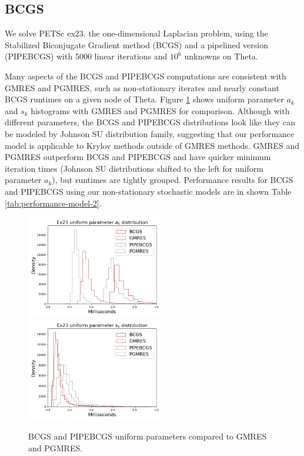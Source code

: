 \documentclass[sigconf]{acmart}
\begin{document}
\subsection{BCGS}\label{sec:bcgs}

We solve PETSc ex23, the one-dimensional Laplacian problem, using the Stabilized Biconjugate Gradient method (BCGS) and a pipelined version (PIPEBCGS) with 5000 linear iterations and $10^6$ unknowns on Theta.  

Many aspects of the BCGS and PIPEBCGS computations are consistent with GMRES and PGMRES, such as non-stationary iterates and nearly constant BCGS runtimes on a given node of Theta. 
Figure \ref{fig:bcgs} shows uniform parameter $a_k$ and $s_k$ histograms with GMRES and PGMRES for comparison. 
Although with different parameters, the BCGS and PIPEBCGS distributions look like they can be modeled by Johnson SU distribution family, 
suggesting that our performance model is applicable to Krylov methods outside of GMRES methods.
GMRES and PGMRES outperform BCGS and PIPEBCGS and have quicker minimum iteration times (Johnson SU distributions shifted to the left for uniform parameter $a_k$), but runtimes are  tightly grouped.
Performance results for BCGS and PIPEBCGS using our non-stationary stochastic models are in shown Table \ref{tab:performance-model-2}.


\begin{figure}[t]
\centering
\includegraphics[width=6cm]{../plots/BCGS_GMRES_PIPEBCGS_PGMRES_ex23_8192_1000000_uniform_a_k.png} 
\includegraphics[width=6cm]{../plots/BCGS_GMRES_PIPEBCGS_PGMRES_ex23_8192_1000000_uniform_s_k.png}
\caption{BCGS and PIPEBCGS uniform parameters compared to GMRES and PGMRES.} \label{fig:bcgs}
\end{figure}
\end{document}
